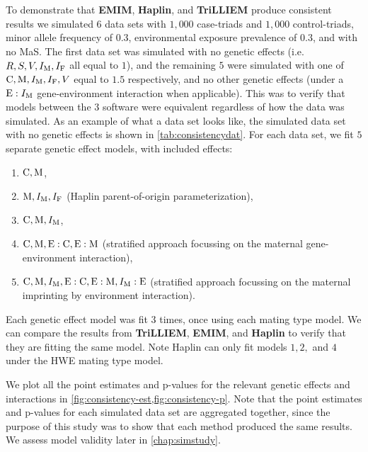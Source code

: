To demonstrate that \textbf{EMIM}, \textbf{Haplin}, and \textbf{TriLLIEM} produce consistent results we simulated $6$ data sets with $1,000$ case-triads and $1,000$ control-triads, minor allele frequency of $0.3$, environmental exposure prevalence of $0.3$, and with no MaS.
The first data set was simulated with no genetic effects (i.e.\ $R,S,V,I_{{\rm M}},I_{{\rm F}}$ all equal to $1$), and the remaining $5$ were simulated with one of ${\rm C}, {\rm M}, I_{{\rm M}}, I_{{\rm F}}, V$ equal to $1.5$ respectively, and no other genetic effects (under a ${\rm E}:I_{{\rm M}}$ gene-environment interaction when applicable).
This was to verify that models between the $3$ software were equivalent regardless of how the data was simulated.
As an example of what a data set looks like, the simulated data set with no genetic effects is shown in \cref{tab:consistencydat}.
For each data set, we fit $5$ separate genetic effect models, with included effects:
\begin{enumerate}
  \item ${\rm C}, {\rm M}$,
  \item ${\rm M}, I_{{\rm M}}, I_{{\rm F}}$ (Haplin parent-of-origin parameterization),
  \item ${\rm C}, {\rm M}, I_{{\rm M}}$,
  \item ${\rm C}, {\rm M}, {\rm E}:{\rm C}, {\rm E}:{\rm M}$ (stratified approach focussing on the maternal gene-environment interaction),
  \item ${\rm C}, {\rm M}, I_{{\rm M}}, {\rm E}:{\rm C}, {\rm E}:{\rm M}, I_{{\rm M}}:{\rm E}$ (stratified approach focussing on the maternal imprinting by environment interaction).
\end{enumerate}
Each genetic effect model was fit $3$ times, once using each mating type model.
We can compare the results from \textbf{TriLLIEM}, \textbf{EMIM}, and \textbf{Haplin} to verify that they are fitting the same model.
Note Haplin can only fit models $1,2,$ and $4$ under the HWE mating type model.

We plot all the point estimates and p-values for the relevant genetic effects and interactions in \cref{fig:consistency-est,fig:consistency-p}.
Note that the point estimates and p-values for each simulated data set are aggregated together, since the purpose of this study was to show that each method produced the same results.
We assess model validity later in \cref{chap:simstudy}.

